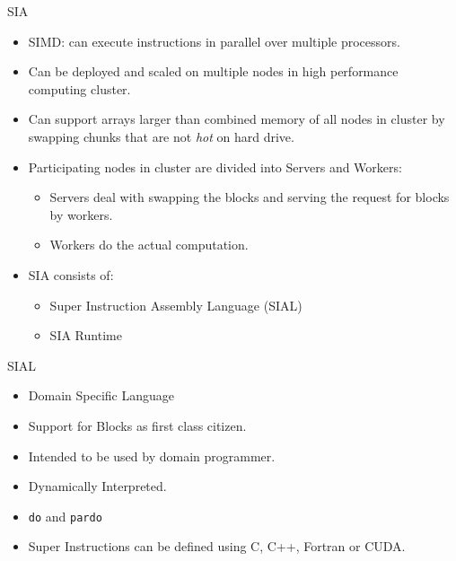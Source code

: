 \documentclass{beamer}
\begin{document}
\begin{frame}{SIA}
  \begin{itemize}
    \pause
  \item SIMD: can execute instructions in parallel over multiple processors.
    \pause
  \item Can be deployed and scaled on multiple nodes in high performance computing cluster.
    \pause
  \item Can support arrays larger than combined memory of all nodes in cluster by
    swapping chunks that are not \textit{hot} on hard drive.
    \pause
  \item Participating nodes in cluster are divided into Servers and Workers:
    \begin{itemize}
      \pause
    \item Servers deal with swapping the blocks and serving the request for blocks
      by workers.
      \pause
    \item Workers do the actual computation.
    \end{itemize}
    \pause
  \item SIA consists of:
    \begin{itemize}
      \pause
    \item Super Instruction Assembly Language (SIAL)
      \pause
    \item SIA Runtime
    \end{itemize}
  \end{itemize}
\end{frame}

\begin{frame}{SIAL}
  \begin{itemize}
    \pause
  \item Domain Specific Language
    \pause
  \item Support for Blocks as first class citizen.
    \pause
  \item Intended to be used by domain programmer.
    \pause
  \item Dynamically Interpreted.
    \pause
  \item \texttt{do} and \texttt{pardo}
    \pause
  \item Super Instructions can be defined using C, C++, Fortran
    \pause
    or CUDA.
  \end{itemize}
\end{frame}
\end{document}
